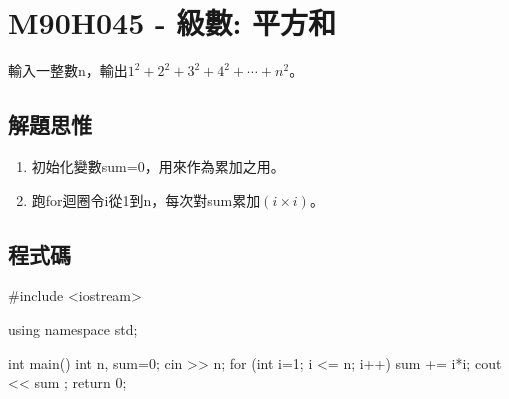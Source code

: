 \section{M90H045 - 級數: 平方和}
輸入一整數n，輸出$1^2+2^2+3^2+4^2+\cdots+n^2$。
\subsection{解題思惟}
\begin{enumerate}
	\item 初始化變數sum=0，用來作為累加之用。
	\item 跑for迴圈令i從1到n，每次對sum累加$(i\times i)$。
\end{enumerate}
\subsection{程式碼}
\begin{cppcode}
#include <iostream>

using namespace std;

int main()
{
	int n, sum=0;
	cin >> n;
	for (int i=1; i <= n; i++) {
		sum += i*i;
	}
	cout << sum ;
	return 0;
}
\end{cppcode}
